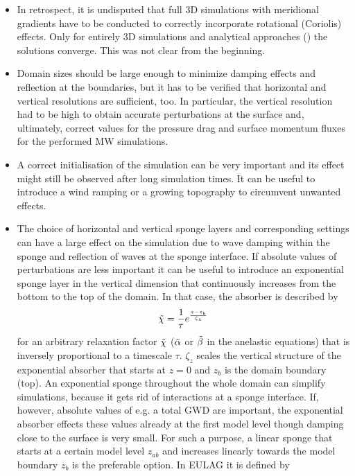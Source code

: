 \begin{itemize}
    \item In retrospect, it is undisputed that full 3D simulations with meridional gradients have to be conducted to correctly incorporate rotational (Coriolis) effects. Only for entirely 3D simulations and analytical approaches (\cite[]{miranda_non-linear_1992}) the solutions converge. This was not clear from the beginning. 
    \item Domain sizes should be large enough to minimize damping effects and reflection at the boundaries, but it has to be verified that horizontal and vertical resolutions are sufficient, too. In particular, the vertical resolution had to be high to obtain accurate perturbations at the surface and, ultimately, correct values for the pressure drag and surface momentum fluxes for the performed MW simulations. 
    \item A correct initialisation of the simulation can be very important and its effect might still be observed after long simulation times. It can be useful to introduce a wind ramping or a growing topography to circumvent unwanted effects.
    \item The choice of horizontal and vertical sponge layers and corresponding settings can have a large effect on the simulation due to wave damping within the sponge and reflection of waves at the sponge interface. If absolute values of perturbations are less important it can be useful to introduce an exponential sponge layer in the vertical dimension that continuously increases from the bottom to the top of the domain. In that case, the absorber is described by
    \begin{equation}
        \Tilde{\chi} = \frac{1}{\tau} e^{\frac{z-z_b}{\zeta_z}}
        \label{equ:exp-sponge}
    \end{equation}
    for an arbitrary relaxation factor $\Tilde{\chi}$ ($\Tilde{\alpha}$ or $\Tilde{\beta}$ in the anelastic equations) that is inversely proportional to a timescale $\tau$. $\zeta_z$ scales the vertical structure of the exponential absorber that starts at $z=0$ and $z_b$ is the domain boundary (top). An exponential sponge throughout the whole domain can simplify simulations, because it gets rid of interactions at a sponge interface. If, however, absolute values of e.g. a total GWD are important, the exponential absorber effects these values already at the first model level though damping close to the surface is very small. For such a purpose, a linear sponge that starts at a certain model level $z_{ab}$ and increases linearly towards the model boundary $z_b$ is the preferable option. In EULAG it is defined by

\end{itemize}

